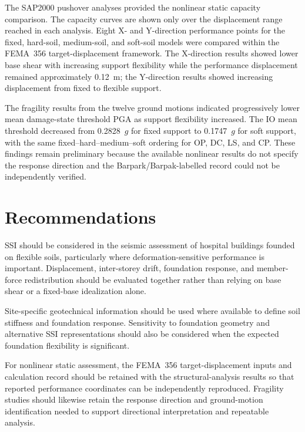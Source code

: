 The SAP2000 pushover analyses provided the nonlinear static capacity comparison. The capacity curves are shown only over the displacement range reached in each analysis. Eight X- and Y-direction performance points for the fixed, hard-soil, medium-soil, and soft-soil models were compared within the FEMA~356 target-displacement framework. The X-direction results showed lower base shear with increasing support flexibility while the performance displacement remained approximately 0.12~m; the Y-direction results showed increasing displacement from fixed to flexible support.

The fragility results from the twelve ground motions indicated progressively lower mean damage-state threshold PGA as support flexibility increased. The IO mean threshold decreased from 0.2828~$g$ for fixed support to 0.1747~$g$ for soft support, with the same fixed--hard--medium--soft ordering for OP, DC, LS, and CP. These findings remain preliminary because the available nonlinear results do not specify the response direction and the Barpark/Barpak-labelled record could not be independently verified.

\section{Recommendations}
SSI should be considered in the seismic assessment of hospital buildings founded on flexible soils, particularly where deformation-sensitive performance is important. Displacement, inter-storey drift, foundation response, and member-force redistribution should be evaluated together rather than relying on base shear or a fixed-base idealization alone.

Site-specific geotechnical information should be used where available to define soil stiffness and foundation response. Sensitivity to foundation geometry and alternative SSI representations should also be considered when the expected foundation flexibility is significant.

For nonlinear static assessment, the FEMA~356 target-displacement inputs and calculation record should be retained with the structural-analysis results so that reported performance coordinates can be independently reproduced. Fragility studies should likewise retain the response direction and ground-motion identification needed to support directional interpretation and repeatable analysis.

